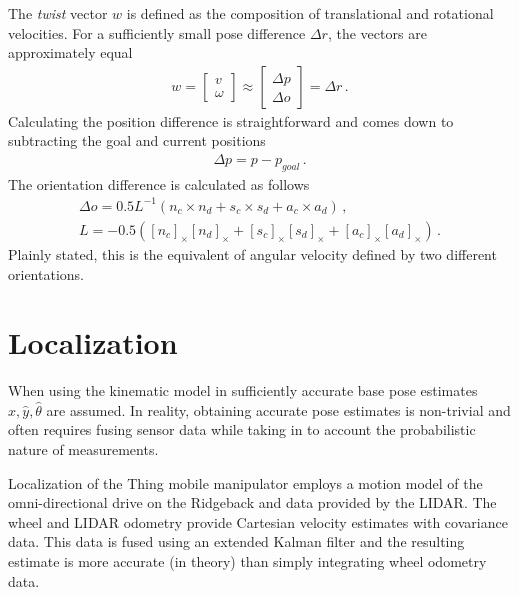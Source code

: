\documentclass[times, utf8, diplomski, english]{fer}
\begin{document}
The \textit{twist} vector $w$ is defined as the composition of translational and rotational velocities.
For a sufficiently small pose difference $\Delta r$, the vectors are approximately equal
\begin{align}\label{eq:pose_diff}
w  = 
\begin{bmatrix} 
v \\ \omega 
\end{bmatrix} 
\approx 
\begin{bmatrix}
\Delta p \\
\Delta o
\end{bmatrix}
= 
\Delta r \, .
\end{align}
Calculating the position difference is straightforward and comes down to subtracting the goal and current positions
\begin{align}
\Delta p = p - p_{goal}\, .
\end{align}
The orientation difference is calculated as follows \citep{sciavicco2012modelling}
\begin{subequations}\label{eq:pose difference}
\begin{gather}
\Delta o = 0.5 L^{-1} \left( n_c\times n_d + s_c\times s_d + a_c\times a_d \right)\, , \\
L = - 0.5 \left(\left[n_c\right]_{\times}\left[n_d\right]_{\times} + \left[s_c\right]_{\times}\left[s_d\right]_{\times} 
+ \left[a_c\right]_{\times}\left[a_d\right]_{\times} \right)\, .
\end{gather}
\end{subequations}
Plainly stated, this is the equivalent of angular velocity defined by two different orientations.
\section{Localization}\label{section:Localization}
When using the kinematic model in  sufficiently accurate base pose estimates $\hat{x},\hat{y},\hat{\theta}$ are assumed.
In reality, obtaining accurate pose estimates is non-trivial and often requires fusing sensor data while taking in to account the probabilistic nature of measurements.

Localization of the Thing mobile manipulator employs a motion model of the omni-directional drive on the Ridgeback and data provided by the LIDAR.
The wheel and LIDAR odometry provide Cartesian velocity estimates with covariance data.
This data is fused using an extended Kalman filter and the resulting estimate is more accurate (in theory) than simply integrating wheel odometry data.
\end{document}
